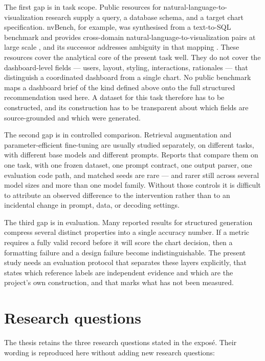 The first gap is in task scope. Public resources for natural-language-to-visualization research supply a query, a database schema, and a target chart specification. nvBench, for example, was synthesised from a text-to-SQL benchmark and provides cross-domain natural-language-to-visualization pairs at large scale \cite{luo2021nvbenchsigmod,yu2018spider}, and its successor addresses ambiguity in that mapping \cite{luo2025nvbench2}. These resources cover the analytical core of the present task well. They do not cover the dashboard-level fields --- users, layout, styling, interactions, rationales --- that distinguish a coordinated dashboard from a single chart. No public benchmark maps a dashboard brief of the kind defined above onto the full structured recommendation used here. A dataset for this task therefore has to be constructed, and its construction has to be transparent about which fields are source-grounded and which were generated.

The second gap is in controlled comparison. Retrieval augmentation and parameter-efficient fine-tuning are usually studied separately, on different tasks, with different base models and different prompts. Reports that compare them on one task, with one frozen dataset, one prompt contract, one output parser, one evaluation code path, and matched seeds are rare --- and rarer still across several model sizes and more than one model family. Without those controls it is difficult to attribute an observed difference to the intervention rather than to an incidental change in prompt, data, or decoding settings.

The third gap is in evaluation. Many reported results for structured generation compress several distinct properties into a single accuracy number. If a metric requires a fully valid record before it will score the chart decision, then a formatting failure and a design failure become indistinguishable. The present study needs an evaluation protocol that separates these layers explicitly, that states which reference labels are independent evidence and which are the project's own construction, and that marks what has not been measured.

\section{Research questions}

The thesis retains the three research questions stated in the exposé. Their wording is reproduced here without adding new research questions:

